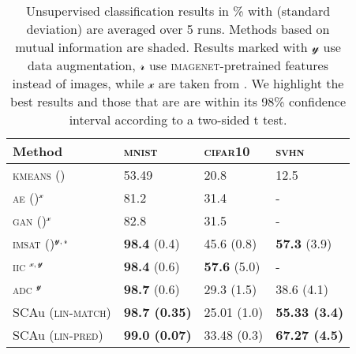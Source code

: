 \begin{table}
	\centering
		\caption{
			Unsupervised classification results in \% with (standard deviation) are averaged over 5 runs. Methods based on mutual information are shaded. Results marked with $\mathcal{y}$ use data augmentation, ${\mathcal{r}}$ use \textsc{imagenet}-pretrained features instead of images, while ${\mathcal{x}}$ are taken from \cite{Ji2018iic}. We highlight the best results and those that are are within its 98\% confidence interval according to a two-sided t test.
		}
		\label{tab:results}
		\centering
		\begin{tabular}{@{}llll@{}}
			Method & \textsc{mnist} & \textsc{cifar10} & \textsc{svhn} \\
			\midrule
			\textsc{kmeans} (\cite{Haeusser2018adc}) & 53.49 & 20.8 & 12.5 \\
			\textsc{ae} (\cite{Bengio2007greedy})$^{\mathcal{x}}$ & 81.2 & 31.4 & - \\
			\textsc{gan} (\cite{Radford2016gan})$^{\mathcal{x}}$ & 82.8 & 31.5 & - \\
			\rowcolor[HTML]{EFEFEF} 
			\textsc{imsat} (\cite{Hu2017imsat})$^{\mathcal{y}, \mathcal{r}}$ & \textbf{98.4} (0.4) & 45.6 (0.8) & \textbf{57.3} (3.9) \\ 
			\rowcolor[HTML]{EFEFEF} 
			\textsc{iic} \citep{Ji2018iic}$^{\mathcal{x}, \mathcal{y}}$ & \textbf{98.4} (0.6) & \textbf{57.6} (5.0) & - \\
			\rowcolor[HTML]{EFEFEF} 
			\textsc{adc} \citep{Haeusser2018adc}$^\mathcal{y}$ & \textbf{98.7} (0.6) & 29.3 (1.5) & 38.6 (4.1) \\
			\midrule
			\gls{SCAu} (\textsc{lin-match}) & \textbf{98.7 (0.35)} & 25.01 (1.0) & \textbf{55.33 (3.4)} \\ 
			\gls{SCAu} (\textsc{lin-pred}) & \textbf{99.0 (0.07)} & 33.48 (0.3) & \textbf{67.27 (4.5)} \\
		\end{tabular}
\end{table}

